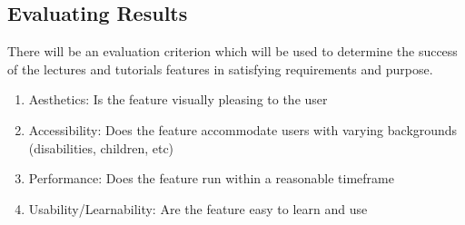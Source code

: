 \subsection{Evaluating Results}
There will be an evaluation criterion which will be used to determine the success of the lectures and tutorials features in satisfying requirements and purpose.

\begin{enumerate}
    \item Aesthetics: Is the feature visually pleasing to the user
    \item Accessibility: Does the feature accommodate users with varying backgrounds (disabilities, children, etc)
    \item Performance: Does the feature run within a reasonable timeframe
    \item Usability/Learnability: Are the feature easy to learn and use
\end{enumerate}